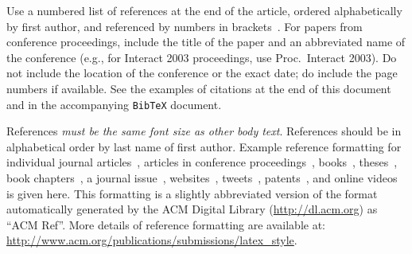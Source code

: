\documentclass{sigchi-ext}
\begin{document}
    Use a numbered list of references at the end of the article, ordered
    alphabetically by first author, and referenced by numbers in
    brackets~\cite{ethics,Klemmer:2002:WSC:503376.503378}. For papers from
    conference proceedings, include the title of the paper and an
    abbreviated name of the conference (e.g., for Interact 2003
    proceedings, use Proc.\ Interact 2003). Do not include the location of
    the conference or the exact date; do include the page numbers if
    available. See the examples of citations at the end of this document
    and in the accompanying \texttt{BibTeX} document.
    
    References \textit{must be the same font size as other body
      text}. References should be in alphabetical order by last name of
    first author. Example reference formatting for individual journal
    articles~\cite{ethics}, articles in conference
    proceedings~\cite{Klemmer:2002:WSC:503376.503378},
    books~\cite{Schwartz:1995:GBF}, theses~\cite{sutherland:sketchpad},
    book chapters~\cite{winner:politics}, a journal issue~\cite{kaye:puc},
    websites~\cite{acm_categories,cavender:writing},
    tweets~\cite{CHINOSAUR:venue}, patents~\cite{heilig:sensorama}, and
    online videos~\cite{psy:gangnam} is given here. This formatting is a
    slightly abbreviated version of the format automatically generated by
    the ACM Digital Library (\url{http://dl.acm.org}) as ``ACM Ref''. More
    details of reference formatting are available at:
    \url{http://www.acm.org/publications/submissions/latex_style}.
\fi


\balance{} 

% 

% 

\end{document}
